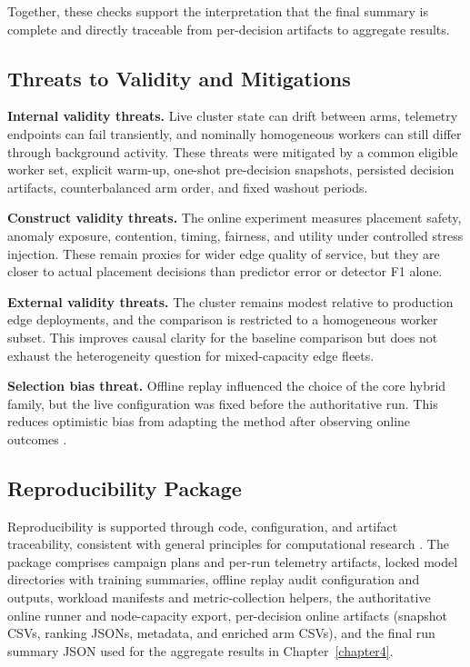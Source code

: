 Together, these checks support the interpretation that the final summary is complete and directly traceable from per-decision artifacts to aggregate results.


\subsection{Threats to Validity and Mitigations}

\textbf{Internal validity threats.} Live cluster state can drift between arms, telemetry endpoints can fail transiently, and nominally homogeneous workers can still differ through background activity. These threats were mitigated by a common eligible worker set, explicit warm-up, one-shot pre-decision snapshots, persisted decision artifacts, counterbalanced arm order, and fixed washout periods.

\textbf{Construct validity threats.} The online experiment measures placement safety, anomaly exposure, contention, timing, fairness, and utility under controlled stress injection. These remain proxies for wider edge quality of service, but they are closer to actual placement decisions than predictor error or detector F1 alone.

\textbf{External validity threats.} The cluster remains modest relative to production edge deployments, and the comparison is restricted to a homogeneous worker subset. This improves causal clarity for the baseline comparison but does not exhaust the heterogeneity question for mixed-capacity edge fleets.

\textbf{Selection bias threat.} Offline replay influenced the choice of the core hybrid family, but the live configuration was fixed before the authoritative run. This reduces optimistic bias from adapting the method after observing online outcomes \cite{cawley2010overfitting}.


\subsection{Reproducibility Package}

Reproducibility is supported through code, configuration, and artifact traceability, consistent with general principles for computational research \cite{peng2011reproducible}. The package comprises campaign plans and per-run telemetry artifacts, locked model directories with training summaries, offline replay audit configuration and outputs, workload manifests and metric-collection helpers, the authoritative online runner and node-capacity export, per-decision online artifacts (snapshot CSVs, ranking JSONs, metadata, and enriched arm CSVs), and the final run summary JSON used for the aggregate results in Chapter~\ref{chapter4}.
